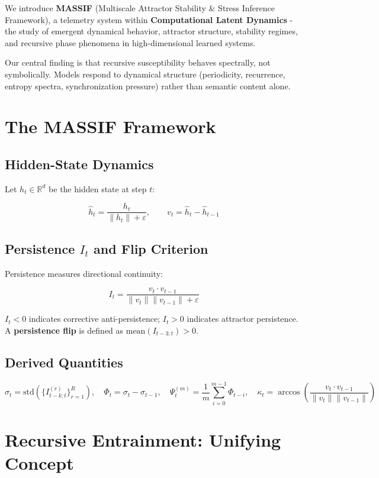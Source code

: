 \documentclass{article}
\begin{document}
We introduce \textbf{MASSIF} (Multiscale Attractor Stability \& Stress Inference Framework), a telemetry system within \textbf{Computational Latent Dynamics} - the study of emergent dynamical behavior, attractor structure, stability regimes, and recursive phase phenomena in high-dimensional learned systems.

Our central finding is that recursive susceptibility behaves spectrally, not symbolically. Models respond to dynamical structure (periodicity, recurrence, entropy spectra, synchronization pressure) rather than semantic content alone.

\section{The MASSIF Framework}

\subsection{Hidden-State Dynamics}

Let $h_t \in \mathbb{R}^d$ be the hidden state at step $t$:

$$\hat{h}_t = \frac{h_t}{\|h_t\| + \varepsilon}, \qquad v_t = \hat{h}_t - \hat{h}_{t-1}$$

\subsection{Persistence \texorpdfstring{$I_t$}{It} and Flip Criterion}

Persistence measures directional continuity:

$$I_t = \frac{v_t \cdot v_{t-1}}{\|v_t\| \|v_{t-1}\| + \varepsilon}$$

$I_t < 0$ indicates corrective anti-persistence; $I_t > 0$ indicates attractor persistence. A \textbf{persistence flip} is defined as $\text{mean}(I_{t-3:t}) > 0$.

\subsection{Derived Quantities}

$$\sigma_t = \text{std}(\{I_{t-k:t}^{(r)}\}_{r=1}^{R}), \quad \Phi_t = \sigma_t - \sigma_{t-1}, \quad \Psi_t^{(m)} = \frac{1}{m}\sum_{i=0}^{m-1}\Phi_{t-i}, \quad \kappa_t = \arccos\left(\frac{v_t \cdot v_{t-1}}{\|v_t\|\|v_{t-1}\|}\right)$$

\section{Recursive Entrainment: Unifying Concept}
\end{document}
